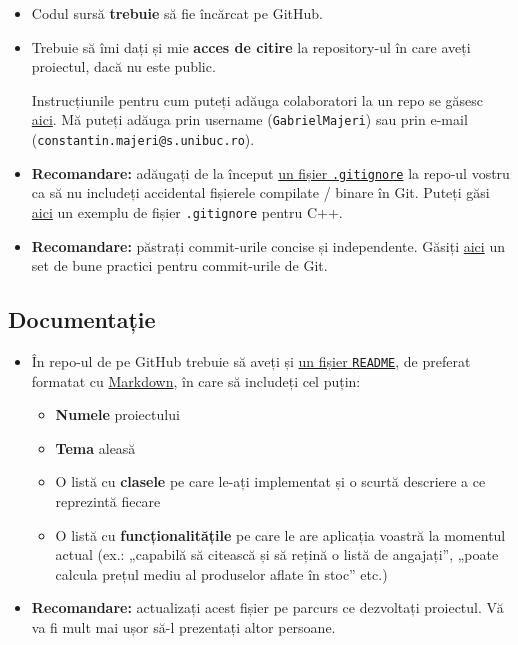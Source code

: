 \begin{itemize}
    \item Codul sursă \textbf{trebuie} să fie încărcat pe GitHub.
    
    \item Trebuie să îmi dați și mie \textbf{acces de citire} la repository-ul în care aveți proiectul, dacă nu este public.
    
    Instrucțiunile pentru cum puteți adăuga colaboratori la un repo se găsesc \href{https://docs.github.com/en/account-and-profile/setting-up-and-managing-your-personal-account-on-github/managing-access-to-your-personal-repositories/inviting-collaborators-to-a-personal-repository}{aici}. Mă puteți adăuga prin username (\texttt{GabrielMajeri}) sau prin e-mail (\texttt{constantin.majeri@s.unibuc.ro}).
    
    \item \textbf{Recomandare:} adăugați de la început \href{https://git-scm.com/docs/gitignore}{un fișier \texttt{.gitignore}} la repo-ul vostru ca să nu includeți accidental fișierele compilate / binare în Git. Puteți găsi \href{https://github.com/github/gitignore/blob/main/C\%2B\%2B.gitignore}{aici} un exemplu de fișier \texttt{.gitignore} pentru C++.

    \item \textbf{Recomandare:} păstrați commit-urile concise și independente. Găsiți \href{https://gist.github.com/luismts/495d982e8c5b1a0ced4a57cf3d93cf60}{aici} un set de bune practici pentru commit-urile de Git.
\end{itemize}

\subsection*{Documentație}

\begin{itemize}
    \item În repo-ul de pe GitHub trebuie să aveți și \href{https://www.makeareadme.com/}{un fișier \texttt{README}}, de preferat formatat cu \href{https://www.markdownguide.org/}{Markdown}, în care să includeți cel puțin:
    \begin{itemize}
        \item \textbf{Numele} proiectului
        \item \textbf{Tema} aleasă
        \item O listă cu \textbf{clasele} pe care le-ați implementat și o scurtă descriere a ce reprezintă fiecare
        \item O listă cu \textbf{funcționalitățile} pe care le are aplicația voastră la momentul actual (ex.: „capabilă să citească și să rețină o listă de angajați”, „poate calcula prețul mediu al produselor aflate în stoc” etc.)
    \end{itemize}

    \item \textbf{Recomandare:} actualizați acest fișier pe parcurs ce dezvoltați proiectul. Vă va fi mult mai ușor să-l prezentați altor persoane.
\end{itemize}

